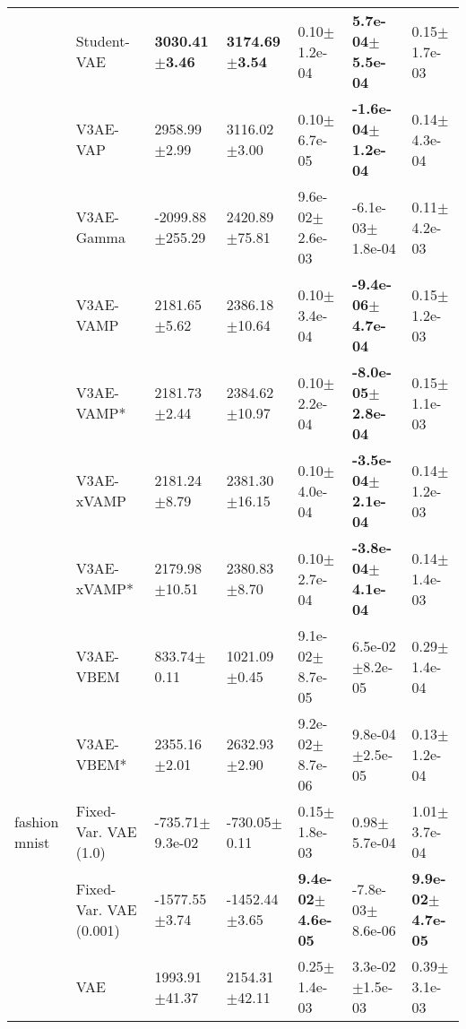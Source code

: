 \begin{tabular}{lllllll}
      & Student-VAE &    \textbf{3030.41$\pm$3.46} &    \textbf{3174.69$\pm$3.54} &              0.10$\pm$1.2e-04 &   \textbf{5.7e-04$\pm$5.5e-04} &              0.15$\pm$1.7e-03 \\
      & V3AE-VAP &             2958.99$\pm$2.99 &             3116.02$\pm$3.00 &              0.10$\pm$6.7e-05 &  \textbf{-1.6e-04$\pm$1.2e-04} &              0.14$\pm$4.3e-04 \\
      & V3AE-Gamma &          -2099.88$\pm$255.29 &            2420.89$\pm$75.81 &           9.6e-02$\pm$2.6e-03 &           -6.1e-03$\pm$1.8e-04 &              0.11$\pm$4.2e-03 \\
      & V3AE-VAMP &             2181.65$\pm$5.62 &            2386.18$\pm$10.64 &              0.10$\pm$3.4e-04 &  \textbf{-9.4e-06$\pm$4.7e-04} &              0.15$\pm$1.2e-03 \\
      & V3AE-VAMP* &             2181.73$\pm$2.44 &            2384.62$\pm$10.97 &              0.10$\pm$2.2e-04 &  \textbf{-8.0e-05$\pm$2.8e-04} &              0.15$\pm$1.1e-03 \\
      & V3AE-xVAMP &             2181.24$\pm$8.79 &            2381.30$\pm$16.15 &              0.10$\pm$4.0e-04 &  \textbf{-3.5e-04$\pm$2.1e-04} &              0.14$\pm$1.2e-03 \\
      & V3AE-xVAMP* &            2179.98$\pm$10.51 &             2380.83$\pm$8.70 &              0.10$\pm$2.7e-04 &  \textbf{-3.8e-04$\pm$4.1e-04} &              0.14$\pm$1.4e-03 \\
      & V3AE-VBEM &              833.74$\pm$0.11 &             1021.09$\pm$0.45 &           9.1e-02$\pm$8.7e-05 &            6.5e-02$\pm$8.2e-05 &              0.29$\pm$1.4e-04 \\
      & V3AE-VBEM* &             2355.16$\pm$2.01 &             2632.93$\pm$2.90 &           9.2e-02$\pm$8.7e-06 &            9.8e-04$\pm$2.5e-05 &              0.13$\pm$1.2e-04 \\
fashion mnist & Fixed-Var. VAE (1.0) &          -735.71$\pm$9.3e-02 &             -730.05$\pm$0.11 &              0.15$\pm$1.8e-03 &               0.98$\pm$5.7e-04 &              1.01$\pm$3.7e-04 \\
      & Fixed-Var. VAE (0.001) &            -1577.55$\pm$3.74 &            -1452.44$\pm$3.65 &  \textbf{9.4e-02$\pm$4.6e-05} &           -7.8e-03$\pm$8.6e-06 &  \textbf{9.9e-02$\pm$4.7e-05} \\
      & VAE &            1993.91$\pm$41.37 &            2154.31$\pm$42.11 &              0.25$\pm$1.4e-03 &            3.3e-02$\pm$1.5e-03 &              0.39$\pm$3.1e-03 \\

\end{tabular}
